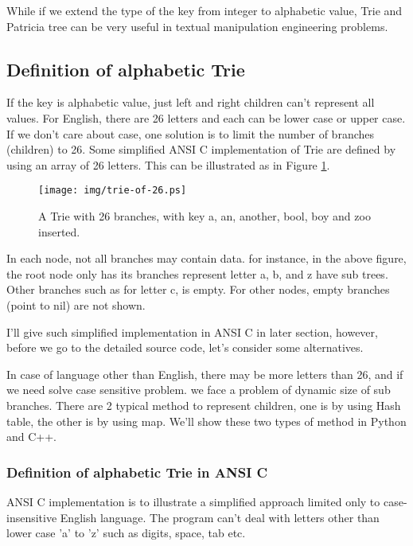 \documentclass{article}
\begin{document}
While if we extend the type of the key from integer to alphabetic
value, Trie and Patricia tree can be very useful in textual manipulation
engineering problems.

\subsection{Definition of alphabetic Trie}
If the key is alphabetic value, just left and right children can't
represent all values. For English, there are 26 letters and each can
be lower case or upper case. If we don't care about case, one solution
is to limit the number of branches (children) to 26. Some simplified
ANSI C implementation of Trie are defined by using an array of 26
letters. This can be illustrated as in Figure \ref{fig:trie-of-26}.

\begin{figure}[htbp]
  \begin{center}
    \texttt{[image: img/trie-of-26.ps]}
      \caption{A Trie with 26 branches, with key a, an, another, bool,
    boy and zoo inserted.}
      \label{fig:trie-of-26}
  \end{center}
\end{figure}

In each node, not all branches may contain data. for instance, in the
above figure, the root node only has its branches represent letter a,
b, and z have sub trees. Other branches such as for letter c, is
empty. For other nodes, empty branches (point to nil) are not shown.

I'll give such simplified implementation in ANSI C in later section,
however, before we go to the detailed source code, let's consider some
alternatives. 

In case of language other than English, there may be more letters than 26, 
and if we need
solve case sensitive problem. we face a problem of dynamic size of sub
branches. There are 2 typical method to represent children, one is by
using Hash table, the other is by using map. We'll show these two types
of method in Python and C++.

\subsubsection*{Definition of alphabetic Trie in ANSI C}
ANSI C implementation is to illustrate a simplified approach limited only
to case-insensitive English language. The program can't deal with letters 
other than lower case 'a' to 'z' such as digits, space, tab etc.
\end{document}
